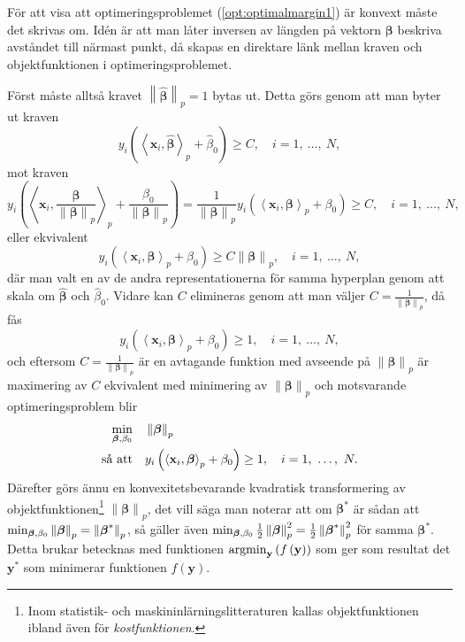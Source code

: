 \documentclass[a4paper, 12pt]{report}
\theoremstyle{definition}
\theoremstyle{remark}
\newcommand{\bfbeta}{{\boldsymbol{\beta}}}
\newcommand{\bfx}{\mathbf{x}}
\newcommand{\bfy}{\mathbf{y}}
\newcommand{\llangle}{\left\langle}
\newcommand{\rrangle}{\right\rangle}
\newcommand{\inner}[2]{\llangle #1, #2 \rrangle}
\begin{document}
För att visa att optimeringsproblemet (\ref{opt:optimalmargin1}) är konvext måste det skrivas om. Idén är att man låter inversen av längden på vektorn $\bfbeta$ beskriva avståndet till närmast punkt, då skapas en direktare länk mellan kraven och objektfunktionen i optimeringsproblemet.

Först måste alltså kravet $\left\|\widehat{\bfbeta}
\right\|_p=1$ bytas ut. Detta görs genom att man byter ut kraven
\begin{equation*}
y_i\left(\inner{\bfx_i}{\widehat{\bfbeta}}_p+\widehat{\beta}_0\right)\geq C,\quad i=1,~\dots,~N,
\end{equation*}
mot kraven
\begin{equation*}
y_i\left(\inner{\bfx_i}{\frac{\bfbeta}{\left\|\bfbeta
\right\|_p}}_p+\frac{\beta_0}{\left\|\bfbeta
\right\|_p}\right) = 
\frac{1}{\left\|\bfbeta
\right\|_p}y_i\left(\inner{\bfx_i}{\bfbeta}_p+\beta_0\right)
 \geq C,\quad i=1,~\dots,~N,
\end{equation*}
eller ekvivalent
\begin{equation*}
y_i\left(\inner{\bfx_i}{\bfbeta}_p+\beta_0\right)\geq C\left\|\bfbeta
\right\|_p,\quad i=1,~\dots,~N,
\end{equation*}
där man valt en av de andra representationerna för samma hyperplan genom att skala om $\widehat{\bfbeta}$ och $\widehat{\beta}_0$. Vidare kan $C$ elimineras genom att man väljer $C=\frac{1}{\left\|\bfbeta
\right\|_p}$, då fås
\begin{equation*}
y_i\left(\inner{\bfx_i}{\bfbeta}_p+\beta_0\right)\geq 1,\quad i=1,~\dots,~N,
\end{equation*}
och eftersom $C=\frac{1}{\left\|\bfbeta
\right\|_p}$ är en avtagande funktion med avseende på $\left\|\bfbeta
\right\|_p$ är maximering av $C$ ekvivalent med minimering av $\left\|\bfbeta
\right\|_p$ och motsvarande optimeringsproblem blir
\begin{equation*}%
\begin{aligned}
\operatornamewithlimits{min}_{\bfbeta, \beta_0} & & &\left\|\bfbeta
\right\|_p\\
\text{så att} & & &y_i\left(\inner{\bfx_i}{\bfbeta}_p+\beta_0\right)\geq 1,\quad i=1,~\dots,~N.
\end{aligned}
\end{equation*}
Därefter görs ännu en konvexitetsbevarande kvadratisk transformering av objektfunktionen\footnote{Inom statistik- och maskininlärningslitteraturen kallas objektfunktionen ibland även för \textit{kostfunktionen}.} $\left\|\bfbeta\right\|_p$, det vill säga man noterar att om $\bfbeta^*$ är sådan att $\operatornamewithlimits{min}_{\bfbeta, \beta_0} \left\|\bfbeta\right\|_p=\left\|\bfbeta^*\right\|_p$, så gäller även $\operatornamewithlimits{min}_{\bfbeta, \beta_0} \frac{1}{2}\left\|\bfbeta\right\|_p^2=\frac{1}{2}\left\|\bfbeta^*\right\|_p^2$ för samma $\bfbeta^*$.
Detta brukar betecknas med funktionen $\operatornamewithlimits{argmin}_{\bfy} \left(f\left(\bfy\right)\right)$ som ger som resultat det $\bfy^*$ som minimerar funktionen $f\left(\bfy\right)$.
\end{document}
